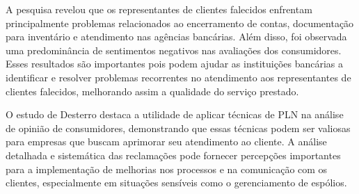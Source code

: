 A pesquisa revelou que os representantes de clientes falecidos enfrentam principalmente problemas relacionados ao encerramento de contas, documentação para inventário e atendimento nas agências bancárias. Além disso, foi observada uma predominância de sentimentos negativos nas avaliações dos consumidores. Esses resultados são importantes pois podem ajudar as instituições bancárias a identificar e resolver problemas recorrentes no atendimento aos representantes de clientes falecidos, melhorando assim a qualidade do serviço prestado.

O estudo de Desterro destaca a utilidade de aplicar técnicas de PLN na análise de opinião de consumidores, demonstrando que essas técnicas podem ser valiosas para empresas que buscam aprimorar seu atendimento ao cliente. A análise detalhada e sistemática das reclamações pode fornecer  percepções importantes para a implementação de melhorias nos processos e na comunicação com os clientes, especialmente em situações sensíveis como o gerenciamento de espólios.
